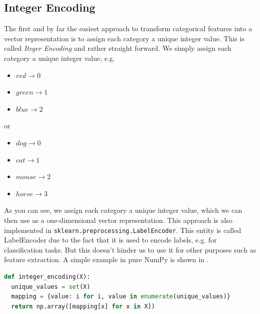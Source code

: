 \subsection{Integer Encoding}
The first and by far the easiest approach to transform categorical features into a vector representation is to assign each category a unique integer value.
This is called \textit{Iteger Encoding} and rather straight forward.
We simply assign each category a unique integer value, e.g.
\begin{itemize}
  \item $red \rightarrow 0$
  \item $green \rightarrow 1$
  \item $blue \rightarrow 2$
\end{itemize}
or
\begin{itemize}
  \item $dog \rightarrow 0$
  \item $cat \rightarrow 1$
  \item $mouse \rightarrow 2$
  \item $horse \rightarrow 3$
\end{itemize}
As you can see, we assign each category a unique integer value, which we can then use as a one-dimensional vector representation.
This approach is also implemented in \lstinline{sklearn.preprocessing.LabelEncoder}.
This entity is called LabelEncoder due to the fact that it is used to encode labels, e.g. for classification tasks.
But this doesn't hinder us to use it for other purposes such as feature extraction.
A simple example in pure NumPy is shown in .

\begin{lstlisting}[language=Python, caption={Integer Encoding in NumPy}, label={code:integer-encoding}]
def integer_encoding(X):
  unique_values = set(X)
  mapping = {value: i for i, value in enumerate(unique_values)}
  return np.array([mapping[x] for x in X])
\end{lstlisting}
